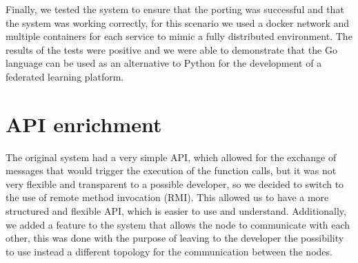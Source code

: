 Finally, we tested the system to ensure that the porting was successful and that the system was working correctly, for this scenario we used a docker network and multiple containers for each service to mimic a fully distributed environment. The results of the tests were positive and we were able to demonstrate that the Go language can be used as an alternative to Python for the development of a federated learning platform.

\section{API enrichment}
The original system had a very simple API, which allowed for the exchange of messages that would trigger the execution of the function calls, but it was not very flexible and transparent to a possible developer, so we decided to switch to the use of remote method invocation (RMI). This allowed us to have a more structured and flexible API, which is easier to use and understand. Additionally, we added a feature to the system that allows the node to communicate with each other, this was done with the purpose of leaving to the developer the possibility to use instead a different topology for the communication between the nodes. 

